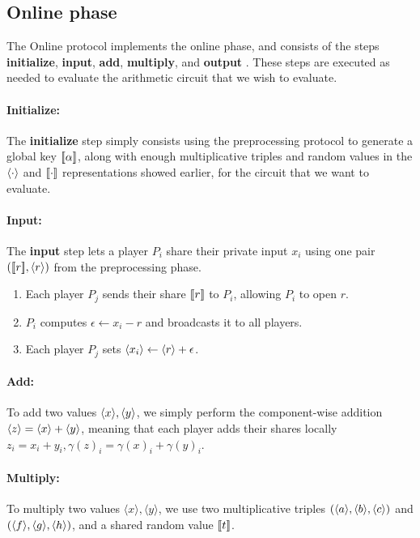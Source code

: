 \documentclass[../main.tex]{subfiles}
\begin{document}
\subsection{Online phase} \label{subsection: Online}
The Online protocol implements the online phase, and consists of the steps \textbf{initialize}, \textbf{input}, \textbf{add}, \textbf{multiply}, and \textbf{output} \cite{damgaard2012multiparty}.
These steps are executed as needed to evaluate the arithmetic circuit that we wish to evaluate.

\paragraph{Initialize:}
The \textbf{initialize} step simply consists using the preprocessing protocol to generate a global key $[\![ \alpha ]\!]$, along with enough multiplicative triples and random values in the $\langle \cdot \rangle$ and $[\![ \cdot ]\!]$ representations showed earlier, for the circuit that we want to evaluate.

\paragraph{Input:}
The \textbf{input} step lets a player $P_i$ share their private input $x_i$ using one pair $([\![ r ]\!], \langle r \rangle)$ from the preprocessing phase.
\begin{enumerate}
    \item Each player $P_j$ sends their share $[\![ r ]\!]$ to $P_i$, allowing $P_i$ to open $r$.
    \item $P_i$ computes $\epsilon \gets x_i - r$ and broadcasts it to all players.
    \item Each player $P_j$ sets $\langle x_i \rangle \gets \langle r \rangle + \epsilon$.
\end{enumerate}

\paragraph{Add:}
To add two values $\langle x \rangle, \langle y \rangle$, we simply perform the component-wise addition $\langle z \rangle = \langle x \rangle + \langle y \rangle$, meaning that each player adds their shares locally $z_i = x_i + y_i, \gamma(z)_i = \gamma(x)_i + \gamma(y)_i$.

\paragraph{Multiply:}
To multiply two values $\langle x \rangle, \langle y \rangle$, we use two multiplicative triples $(\langle a \rangle, \langle b \rangle, \langle c \rangle)$ and $(\langle f \rangle, \langle g \rangle, \langle h \rangle)$, and a shared random value $[\![ t ]\!]$.
\end{document}

